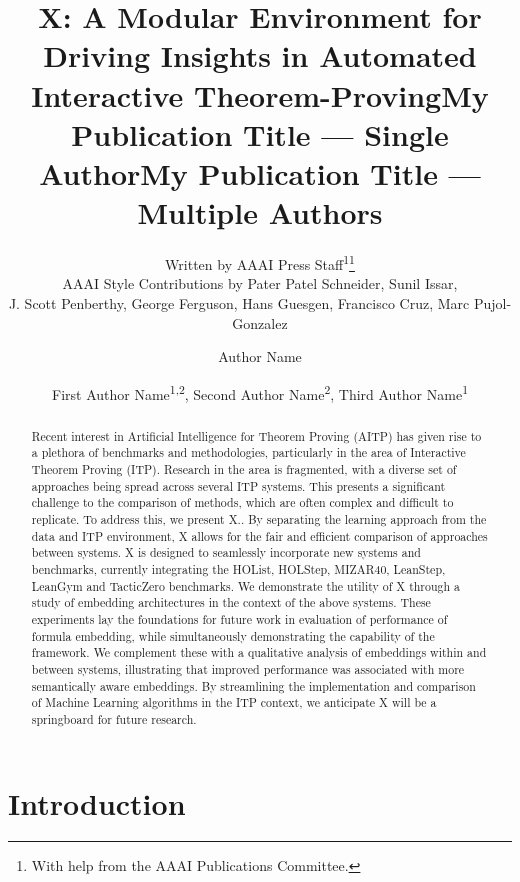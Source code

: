 \documentclass[letterpaper]{article} %
\title{X: A Modular Environment for Driving Insights in Automated Interactive Theorem-Proving}
\author{
    Written by AAAI Press Staff\textsuperscript{\rm 1}\thanks{With help from the AAAI Publications Committee.}\\
    AAAI Style Contributions by Pater Patel Schneider,
    Sunil Issar,\\
    J. Scott Penberthy,
    George Ferguson,
    Hans Guesgen,
    Francisco Cruz\equalcontrib,
    Marc Pujol-Gonzalez\equalcontrib
}
\title{My Publication Title --- Single Author}
\author {
    Author Name
}
\title{My Publication Title --- Multiple Authors}
\author {
    First Author Name\textsuperscript{\rm 1,\rm 2},
    Second Author Name\textsuperscript{\rm 2},
    Third Author Name\textsuperscript{\rm 1}
}
\begin{document}
    \maketitle

    \begin{abstract}
        Recent interest in Artificial Intelligence for Theorem Proving (AITP) has given rise to a plethora of benchmarks and
        methodologies, particularly in the area of Interactive Theorem Proving (ITP).
        Research in the area is fragmented, with a diverse set of approaches being spread across several ITP systems.
        This presents a significant challenge to the comparison of methods, which are often complex and difficult to replicate.
        To address this, we present X..
        By separating the learning approach from the data and ITP environment, X allows for the fair and efficient
        comparison of approaches between systems.
        X is designed to seamlessly incorporate new systems and benchmarks, currently integrating the HOList, HOLStep,
        MIZAR40, LeanStep, LeanGym and TacticZero benchmarks.
        We demonstrate the utility of X through a study of embedding architectures in the context of the above systems.
        These experiments lay the foundations for future work in evaluation of performance of formula embedding,
        while simultaneously demonstrating the capability of the framework.
        We complement these with a qualitative analysis of embeddings within and between systems, illustrating that improved
        performance was associated with more semantically aware embeddings.
        By streamlining the implementation and comparison of Machine Learning algorithms in the ITP context,
        we anticipate X will be a springboard for future
        research.

    \end{abstract}


    \section{Introduction}
\end{document}
